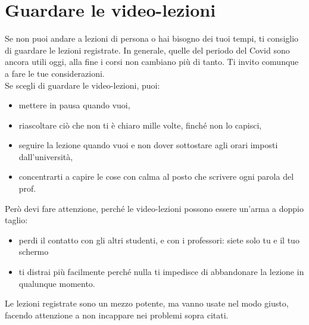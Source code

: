 \documentclass[18pt]{extarticle}
\begin{document}
\section{Guardare le video-lezioni}
Se non puoi andare a lezioni di persona o hai bisogno dei tuoi tempi, ti consiglio di guardare le lezioni registrate. In generale, quelle del periodo del Covid sono ancora utili oggi, alla fine i corsi non cambiano più di tanto. Ti invito comunque a fare le tue considerazioni.\\
Se scegli di guardare le video-lezioni, puoi:
\begin{itemize}
\item mettere in pausa quando vuoi,
\item riascoltare ciò che non ti è chiaro mille volte, finché non lo capisci, 
\item seguire la lezione quando vuoi e non dover sottostare agli orari imposti dall'università, 
\item concentrarti a capire le cose con calma al posto che scrivere ogni parola del prof. 
\end{itemize}%
Però devi fare attenzione, perché le video-lezioni possono essere un'arma a doppio taglio:
\begin{itemize}
\item perdi il contatto con gli altri studenti, e con i professori: siete solo tu e il tuo schermo
\item ti distrai più facilmente perché nulla ti impedisce di abbandonare la lezione in qualunque momento.
\end{itemize}%
Le lezioni registrate sono un mezzo potente, ma vanno usate nel modo giusto, facendo attenzione a non incappare nei problemi sopra citati.
\end{document}
